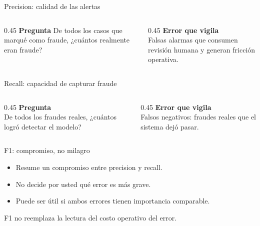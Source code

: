 \documentclass[aspectratio=169,12pt]{beamer}
\begin{document}
\begin{frame}{Precision: calidad de las alertas}
  \relax{\Large\[ \mathrm{Precision} = \frac{TP}{TP + FP} \]}
  \begin{columns}[T]
    \begin{column}{0.45\textwidth}\large
      \textbf{Pregunta} De todos los casos que marqué como fraude, ¿cuántos realmente eran fraude?
    \end{column}
    \begin{column}{0.45\textwidth}\large
      \textbf{Error que vigila}\\
      Falsas alarmas que consumen revisión humana y generan fricción operativa.
    \end{column}
  \end{columns}
\end{frame}

\begin{frame}{Recall: capacidad de capturar fraude}
  \relax{\Large\[ \mathrm{Recall} = \frac{TP}{TP + FN} \]}
  \begin{columns}[T]
    \begin{column}{0.45\textwidth}\large
      \textbf{Pregunta}\\
      De todos los fraudes reales, ¿cuántos logró detectar el modelo?
    \end{column}
    \begin{column}{0.45\textwidth}\large
      \textbf{Error que vigila}\\
      Falsos negativos: fraudes reales que el sistema dejó pasar.
    \end{column}
  \end{columns}
\end{frame}

\begin{frame}{F1: compromiso, no milagro}
  \relax{\Large\[ \mathrm{F1} = 2\,\frac{\mathrm{Precision} \cdot \mathrm{Recall}}{\mathrm{Precision} + \mathrm{Recall}} \]}
  \begin{itemize}\large
    \item Resume un compromiso entre precision y recall.
    \item No decide por usted qué error es más grave.
    \item Puede ser útil si ambos errores tienen importancia comparable.
  \end{itemize}
  \begin{rulebox}[Cuidado]
    \large F1 no reemplaza la lectura del costo operativo del error.
  \end{rulebox}
\end{frame}
\end{document}
